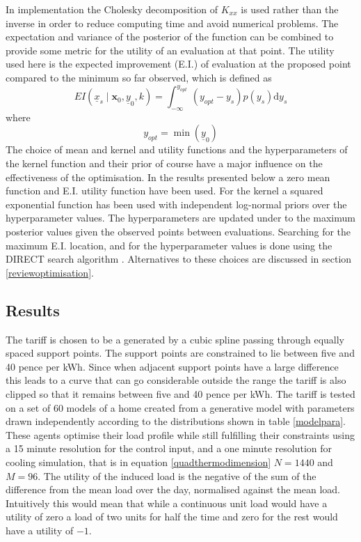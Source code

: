 \documentclass[a4paper, 10 pt, conference]{ieeeconf}  %
\begin{document}
In implementation the Cholesky decomposition of $K_{xx}$ is used rather than the inverse in order to reduce computing time and avoid numerical problems.
The expectation and variance of the posterior of the function can be combined to provide some metric for the utility of an evaluation at that point. The utility used here is the expected improvement (E.I.) of evaluation at the proposed point compared to the minimum so far observed, which is defined as
\begin{equation}
EI(\underline{x}_{s} \mid \mathbf{x}_0, \underline{y}_0, k)= \int_{-\infty  }^{y_{opt}} (y_{opt}-y_{s})p(y_{s}) \mathrm{d}y_{s}
\end{equation}
where
\begin{equation}
y_{opt} = \min(\underline{y}_{0})
\end{equation}
The choice of mean and kernel and utility functions and the hyperparameters of the kernel function and their prior of course have a major influence on the effectiveness of the optimisation. In the results presented below a zero mean function and E.I. utility function have been used. For the kernel a squared exponential function has been used with independent log-normal priors over the hyperparameter values. The hyperparameters are updated under to the maximum posterior values given the observed points between evaluations. Searching for the maximum E.I. location, and for the hyperparameter values is done using the DIRECT search algorithm \cite{jones1993lipschitzian}. Alternatives to these choices are discussed in section \ref{reviewoptimisation}.
\subsection{Results}
\label{result}
The tariff is chosen to be a generated by a cubic spline passing through equally spaced support points. The support points are constrained to lie between five and 40 pence per kWh. Since when adjacent support points have a large difference this leads to a curve that can go considerable outside the range the tariff is also clipped so that it remains between five and 40 pence per kWh. The tariff is tested on a set of 60 models of a home created from a generative model with parameters drawn independently according to the distributions shown in table \ref{modelpara}. These agents optimise their load profile while still fulfilling their constraints using a 15 minute resolution for the control input, and a one minute resolution for cooling simulation, that is in equation \ref{quadthermodimension} $N=1440$ and $M=96$. The utility of the induced load is the negative of the sum of the difference from the mean load over the day, normalised against the mean load. Intuitively this would mean that while a continuous unit load would have a utility of zero a load of two units for half the time and zero for the rest would have a utility of $-1$.
\end{document}
